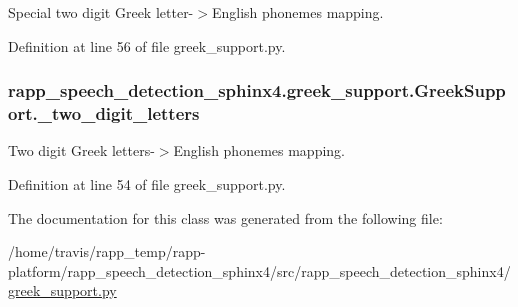 Special two digit Greek letter-\/$>$English phonemes mapping. 



Definition at line 56 of file greek\-\_\-support.\-py.

\hypertarget{classrapp__speech__detection__sphinx4_1_1greek__support_1_1GreekSupport_a86a67ca628328d247fd54cefe02c4962}{
\subsubsection[{\-\_\-two\-\_\-digit\-\_\-letters}]{\setlength{\rightskip}{0pt plus 5cm}rapp\-\_\-speech\-\_\-detection\-\_\-sphinx4.\-greek\-\_\-support.\-Greek\-Support.\-\_\-two\-\_\-digit\-\_\-letters\hspace{0.3cm}{\ttfamily [private]}}}\label{classrapp__speech__detection__sphinx4_1_1greek__support_1_1GreekSupport_a86a67ca628328d247fd54cefe02c4962}


Two digit Greek letters-\/$>$English phonemes mapping. 



Definition at line 54 of file greek\-\_\-support.\-py.



The documentation for this class was generated from the following file\-:\begin{DoxyCompactItemize}
\item 
/home/travis/rapp\-\_\-temp/rapp-\/platform/rapp\-\_\-speech\-\_\-detection\-\_\-sphinx4/src/rapp\-\_\-speech\-\_\-detection\-\_\-sphinx4/\hyperlink{greek__support_8py}{greek\-\_\-support.\-py}\end{DoxyCompactItemize}
